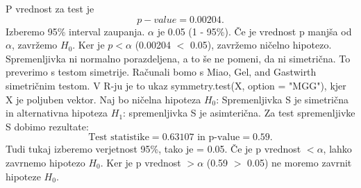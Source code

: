 \documentclass[a4paper,11pt]{article}
\begin{document}
 P vrednost za test je 
\[ p-value = 0.00204. \]
Izberemo 95\% interval zaupanja. \(\alpha\) je 0.05 (1 - 95\%). Če je vrednost p manjša od \(\alpha\), zavržemo \(H_0\). Ker je \(p < \alpha\) (0.00204 \(<\) 0.05), zavržemo ničelno hipotezo. Spremenljivka ni normalno porazdeljena, a to še ne pomeni, da ni simetrična. To preverimo s testom simetrije. Računali bomo s Miao, Gel, and Gastwirth simetričnim testom. V R-ju je to ukaz symmetry.test(X, option = "MGG")\cite{lawstat}, kjer X je poljuben vektor. Naj bo ničelna hipoteza \(H_0\): Spremenljivka S je simetrična in alternativna hipoteza \(H_1\): spremenljivka S je asimterična. Za test spremenljivke S dobimo rezultate:
\[\text{Test statistike} = 0.63107 \text{ in p-value} =  0.59.\]
Tudi tukaj izberemo verjetnost 95\%, tako je \alpha = 0.05. Če je p vrednost \(< \alpha\), lahko zavrnemo hipotezo \(H_0\). Ker je p vrednost \(> \alpha\) (0.59 \(>\) 0.05) ne moremo zavrnit hipoteze \(H_0\).
\end{document}
